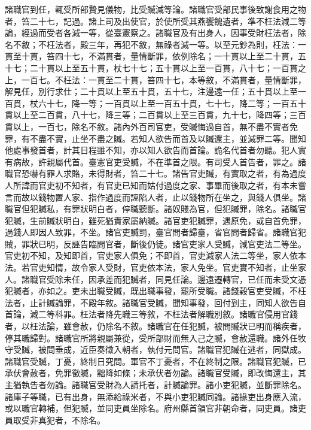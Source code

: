 \begin{pinyinscope}
 諸職官到任，輒受所部贄見儀物，比受贓減等論。諸職官受部民事後致謝食用之物者，笞二十七，記過。諸上司及出使官，於使所受其燕饗餽遺者，準不枉法減二等論，經過而受者各減一等，從臺憲察之。諸職官及有出身人，因事受財枉法者，除名不敘；不枉法者，殿三年，再犯不敘，無祿者減一等。以至元鈔為則，枉法：一貫至十貫，笞四十七，不滿貫者，量情斷罪，依例除名；一十貫以上至二十貫，五十七；二十貫以上至五十貫，杖七十七；五十貫以上至一百貫，八十七；一百貫之上，一百七。不枉法：一貫至二十貫，笞四十七，本等敘，不滿貫者，量情斷罪，解見任，別行求仕；二十貫以上至五十貫，五十七，注邊遠一任；五十貫以上至一百貫，杖六十七，降一等；一百貫以上至一百五十貫，七十七，降二等；一百五十貫以上至二百貫，八十七，降三等；二百貫以上至三百貫，九十七，降四等；三百貫以上，一百七，除名不敘。諸內外百司官吏，受贓悔過自首，無不盡不實者免罪，有不盡不實，止坐不盡之贓。若知人欲告而首及以贓還主，並減罪二等。聞知他處事發首者，計其日程雖不知，亦以知人欲告而首論。詭名代首者勿聽。犯人實有病故，許親屬代首。臺憲官吏受贓，不在準首之限。有司受人首告者，罪之。諸職官恐嚇有罪人求賂，未得財者，笞二十七。諸告官吏贓，有實取之者，有為過度人所諱而官吏初不知者，有官吏已知而姑付過度之家、事畢而後取之者，有本未嘗言而故以錢物置人家、指作過度而誣陷人者，止以錢物所在坐之，與錢人俱坐。諸職官但犯贓私，有罪狀明白者，停職聽斷。諸奴賤為官，但犯贓罪，除名。諸職官犯贓，生前贓狀明白，雖死猶責家屬納贓。諸官吏犯贓罪，遇原免，或自首免罪，過錢人即因人致罪，不坐。諸官吏贓罰，臺官問者歸臺，省官問者歸省。諸職官犯賊，罪狀已明，反誣告臨問官者，斷後仍徒。諸官吏家人受贓，減官吏法二等坐。官吏初不知，及知即首，官吏家人俱免；不即首，官吏減家人法二等坐，家人依本法。若官吏知情，故令家人受財，官吏依本法，家人免坐。官吏實不知者，止坐家人。諸職官受除未任，因承差而犯贓者，同見任論。邊遠遷轉官，已任而未受文憑犯贓者，亦如之。吏未出職受贓，既出職事發，罷所受職。諸錢穀官吏受贓，不枉法者，止計贓論罪，不殿年敘。諸職官受贓，聞知事發，回付到主，同知人欲告自首論，減二等科罪。枉法者降先職三等敘，不枉法者解職別敘。諸職官侵用官錢者，以枉法論，雖會赦，仍除名不敘。諸職官在任犯贓，被問贓狀已明而稱疾者，停其職歸對。諸職官所將親屬兼從，受所部財而無入己之贓，會赦還職。諸外任牧守受贓，被問垂成，近臣奏徵入朝者，執付元問官。諸職官犯贓在逃者，同獄成。諸職官受贓，丁憂，終制日究問。軍官不丁憂者，不在終制之限。諸職官犯贓，已承伏會赦者，免罪徵贓，黜降如條；未承伏者勿論。諸職官受贓，即改悔還主，其主猶執告者勿論。諸職官受財為人請托者，計贓論罪。諸小吏犯贓，並斷罪除名。諸庫子等職，已有出身，無添給祿米者，不與小吏犯贓同論。諸掾吏出身應入流，或以職官轉補，但犯贓，並同吏員坐除名。府州縣首領官非朝命者，同吏員。諸吏員取受非真犯者，不除名。




\end{pinyinscope}
